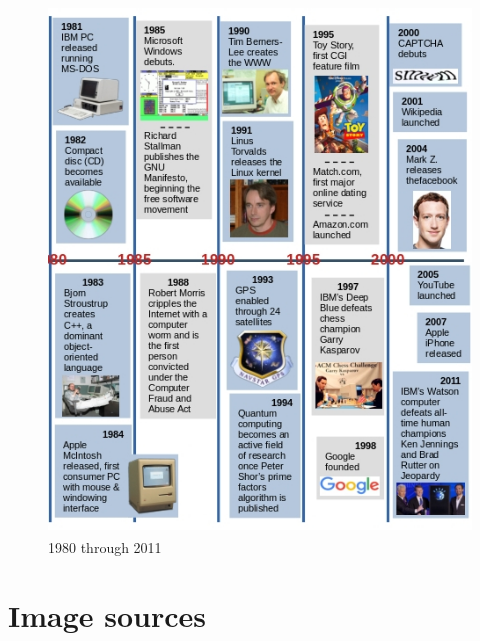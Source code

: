 \begin{figure}[H]
	\begin{center}
		\caption{1980 through 2011}
		\vskip 4pt
		\includegraphics[height=5.5in]{cs-timeline/CSHistoryTimeline-Part2b.jpg}
	\end{center}
\end{figure}

\newpage

\section{Image sources}

